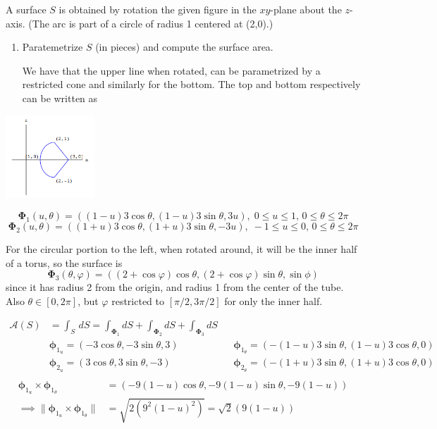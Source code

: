 \documentclass{article}
\newcommand{\norm}[1]{\| #1 \|}
\begin{document}
\thispagestyle{fancy}
\begin{enumerate}
    \begin{multicols}{2}
    \item A surface $S$ is obtained by rotation the given figure in the $xy$-plane about the $z$-axis. (The arc is part of a circle of radius 1 centered at (2,0).)
        \begin{enumerate}
            \item Paratemetrize $S$ (in pieces) and compute the surface area.

            We have that the upper line when rotated, can be parametrized by a restricted cone and similarly for the bottom. The top and bottom respectively can be written as 
        \end{enumerate}
            \includegraphics[width=0.25\textwidth]{b42-a8-q1ex}
    \end{multicols}
    \[ \boldsymbol \Phi_1 (u,\theta) = ((1-u)3 \cos \theta, (1-u)3 \sin \theta, 3u) ,\; 0\leq u \leq 1,\, 0 \leq \theta \leq 2\pi\] 
    \[ \boldsymbol \Phi_2 (u,\theta) = ((1+u)3 \cos \theta, (1+u)3 \sin \theta, -3u) ,\; -1 \leq u \leq 0 ,\, 0 \leq \theta \leq 2\pi\] 

    For the circular portion to the left, when rotated around, it will be the inner half of a torus, so the surface is
    \[ \boldsymbol \Phi_3 (\theta, \varphi) = ((2+\cos\varphi)\cos \theta, (2+\cos\varphi)\sin \theta, \sin \phi)\]
    since it has radius 2 from the origin, and radius 1 from the center of the tube. Also $\theta \in [0,2\pi]$, but $\varphi$ restricted to $[\pi/2, 3\pi/2]$ for only the inner half.

    \begin{align*}
        \mathcal A (S) &= \int_S \,dS = \int_{\boldsymbol \Phi_1} dS + \int_{\boldsymbol \Phi_2} dS + \int_{\boldsymbol \Phi_3} dS \\
        &\boldsymbol \phi_{1_u} = (-3 \cos \theta, -3\sin \theta, 3) & &  \boldsymbol \phi_{1_ \theta} = (- (1-u) 3 \sin \theta, (1-u)3\cos\theta, 0) & \\
        & \boldsymbol \phi_{2_u} = (3 \cos \theta, 3\sin \theta, -3)  & & \boldsymbol \phi_{2_ \theta} = (- (1+u) 3 \sin \theta, (1+u)3\cos\theta, 0) & \\
    \end{align*}
    \begin{align*}
        \boldsymbol \phi_{1_u} \times \boldsymbol \phi_{1_ \theta} &=       (-9(1-u)\cos\theta, -9(1-u)\sin\theta, -9(1-u)) \\
        \implies \norm {\boldsymbol \phi_{1_u} \times \boldsymbol \phi_{1_ \theta}} &= \sqrt{2(9^2(1-u)^2)} = \sqrt{2}(9(1-u))
    \end{align*}


\end{enumerate}
\end{document}

